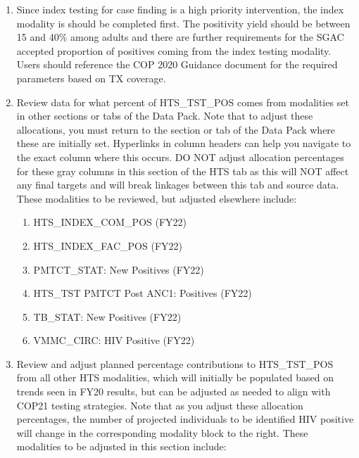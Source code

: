 \documentclass[
  openany]{book}
\begin{document}
\begin{enumerate}
\def\labelenumi{\arabic{enumi}.}
\item
  Since index testing for case finding is a high priority
  intervention, the index modality is should be completed first. The
  positivity yield should be between 15 and 40\% among adults and there
  are further requirements for the SGAC accepted proportion of
  positives coming from the index testing modality. Users should
  reference the COP 2020 Guidance document for the required parameters
  based on TX coverage.
\item
  Review data for what percent of HTS\_TST\_POS comes from modalities
  set in other sections or tabs of the Data Pack. Note that to adjust
  these allocations, you must return to the section or tab of the Data
  Pack where these are initially set. Hyperlinks in column headers can
  help you navigate to the exact column where this occurs. DO NOT
  adjust allocation percentages for these gray columns in this section
  of the HTS tab as this will NOT affect any final targets and will
  break linkages between this tab and source data. These modalities to
  be reviewed, but adjusted elsewhere include:

  \begin{enumerate}
  \def\labelenumii{\alph{enumii}.}
  \item
    HTS\_INDEX\_COM\_POS (FY22)
  \item
    HTS\_INDEX\_FAC\_POS (FY22)
  \item
    PMTCT\_STAT: New Positives (FY22)
  \item
    HTS\_TST PMTCT Post ANC1: Positives (FY22)
  \item
    TB\_STAT: New Positives (FY22)
  \item
    VMMC\_CIRC: HIV Positive (FY22)
  \end{enumerate}
\item
  Review and adjust planned percentage contributions to HTS\_TST\_POS
  from all other HTS modalities, which will initially be populated
  based on trends seen in FY20 results, but can be adjusted as needed
  to align with COP21 testing strategies. Note that as you adjust
  these allocation percentages, the number of projected individuals to
  be identified HIV positive will change in the corresponding modality
  block to the right. These modalities to be adjusted in this section
  include:


\end{enumerate}
\end{document}
